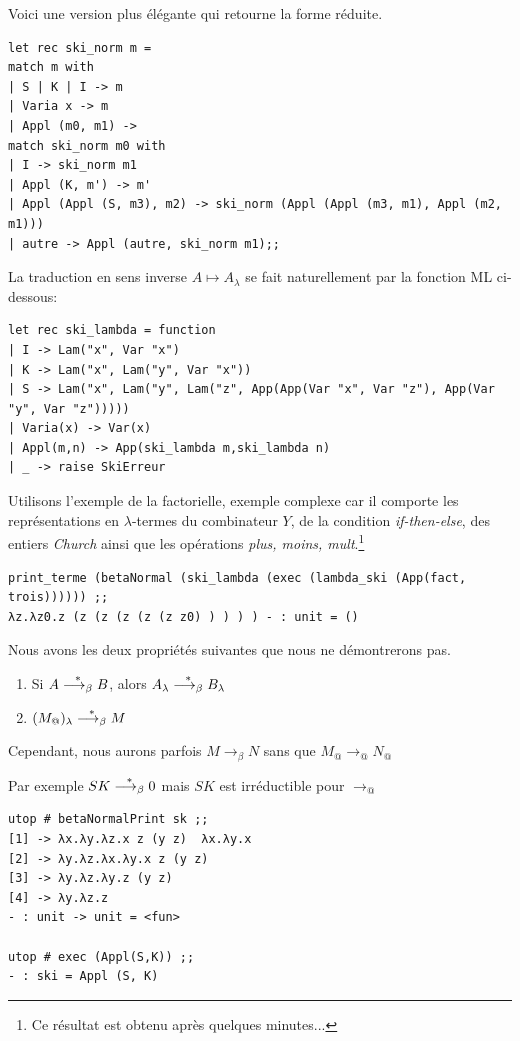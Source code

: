 Voici une version plus élégante qui retourne la forme réduite.
\begin{verbatim}
let rec ski_norm m =
match m with
| S | K | I -> m
| Varia x -> m
| Appl (m0, m1) ->
match ski_norm m0 with
| I -> ski_norm m1
| Appl (K, m') -> m'
| Appl (Appl (S, m3), m2) -> ski_norm (Appl (Appl (m3, m1), Appl (m2, m1)))
| autre -> Appl (autre, ski_norm m1);;
\end{verbatim}

La traduction en sens inverse $A \mapsto A_\lambda $ se fait naturellement par la fonction ML ci-dessous:
\begin{verbatim}
let rec ski_lambda = function
| I -> Lam("x", Var "x")
| K -> Lam("x", Lam("y", Var "x"))
| S -> Lam("x", Lam("y", Lam("z", App(App(Var "x", Var "z"), App(Var "y", Var "z")))))
| Varia(x) -> Var(x)
| Appl(m,n) -> App(ski_lambda m,ski_lambda n)
| _ -> raise SkiErreur
\end{verbatim}

Utilisons l'exemple de la factorielle, exemple complexe car il comporte les représentations en $\lambda$-termes
du combinateur $Y$, de la condition \textit{if-then-else}, des entiers \textit{Church} ainsi que les opérations
\textit{plus, moins, mult}.\footnote{Ce résultat est obtenu après quelques minutes...}
\begin{Verbatim}
print_terme (betaNormal (ski_lambda (exec (lambda_ski (App(fact, trois)))))) ;;
λz.λz0.z (z (z (z (z (z z0) ) ) ) ) - : unit = ()	
\end{Verbatim}

Nous avons les deux propriétés suivantes que nous ne démontrerons pas.
\begin{enumerate}
	\item Si $A \overset{*}{\longrightarrow_{\beta}} B$, alors $A_\lambda \overset{*}{\longrightarrow_{\beta}} B_\lambda$ \\
	\item $(M_@)_\lambda \overset{*}{\longrightarrow_{\beta}} M $ \\
\end{enumerate}


Cependant, nous aurons parfois $M \longrightarrow_\beta N$ sans que $M_@ \longrightarrow_@ N_@$

Par exemple $SK \overset{*}{\longrightarrow_{\beta}} 0$ mais $SK$ est irréductible pour $\longrightarrow_@$
\begin{Verbatim}
utop # betaNormalPrint sk ;;
[1] -> λx.λy.λz.x z (y z)  λx.λy.x
[2] -> λy.λz.λx.λy.x z (y z) 
[3] -> λy.λz.λy.z (y z) 
[4] -> λy.λz.z
- : unit -> unit = <fun>	

utop # exec (Appl(S,K)) ;;
- : ski = Appl (S, K)
\end{Verbatim}

